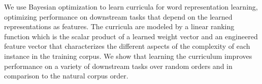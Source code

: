 We use Bayesian optimization to learn curricula for word representation learning, optimizing performance on downstream tasks that depend on the learned representations as features. The curricula are modeled by a linear ranking function which is the scalar product of a learned weight vector and an engineered feature vector that characterizes the different aspects of the complexity of each instance in the training corpus. We show that learning the curriculum improves performance on a variety of downstream tasks over random orders and in comparison to the natural corpus order.
